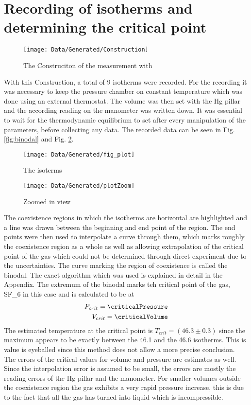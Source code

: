 \documentclass[a4paper,10pt,twocolumn]{article}
\begin{document}
    \section{Recording of isotherms and determining the critical point} \label{sec:Measurement}
    \begin{figure}
        \label{fig:construction}
        \begin{center}
        \texttt{[image: Data/Generated/Construction]}
        \caption[]{The Construciton of the measurement with}
        \end{center}
    \end{figure}
    With this Construction, a total of 9 isotherms were recorded. 
    For the recording it was necessary to keep the pressure chamber on constant temperature which was done using an external thermostat.
    The volume was then set with the Hg pillar and the according reading on the manometer was written down.
    It was essential to wait for the thermodynamic equilibrium to set after every manipulation of the parameters, before collecting any data.
    The recorded data can be seen in Fig. \ref{fig:binodal} and Fig.  \ref{fig:binodalZoom}.
    \begin{figure}
        \begin{center}
            \texttt{[image: Data/Generated/fig\_plot]}\label{fig:binodal}
            \caption[]{The isoterms}
            \texttt{[image: Data/Generated/plotZoom]}\label{fig:binodalZoom}
            \caption[]{Zoomed in view}
        \end{center}
    \end{figure}
    The coexistence regions in which the isotherms are horizontal are highlighted and a line was drawn between the beginning and end point of the region.
    The end points were then used to interpolate a curve through them, which marks roughly the coexistence region as a whole as well as allowing extrapolation of the critical point of the gas which could not be
    determined through direct experiment due to the uncertainties.
    The curve marking the region of coexistence is called the binodal.
    The exact algorithm which was used is explained in detail in the Appendix.
    The extremum of the binodal marks teh critical point of the gas, SF_6\) in this case and is calculated to be at
    \begin{align}
        P_{crit} = \criticalPressure 
        \endline
        V_{crit} = \criticalVolume 
        \end{align}
    The estimated temperature at the critical point is $T_{crit} = (46.3 \pm 0.3)$ since the maximum appears to be exactly between the 46.1\degree\) and the 46.6\degree\) isotherms.
    This is value is eyeballed since this method does not allow a more precise conclusion.
    The errors of the critical values for volume and pressure are estimates as well.
    Since the interpolation error is assumed to be small, the errors are mostly the reading errors of the Hg pillar and the manometer.
    For smaller volumes outside the coexistence region the gas exhibits a very rapid pressure increase, this is due to the fact that all the gas has turned into liquid which is incompressible.
\end{document}
